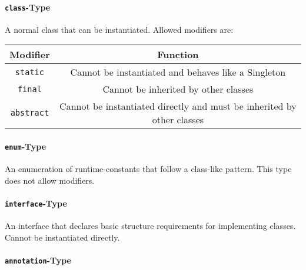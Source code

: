 \documentclass{docs}
\begin{document}
    \paragraph{\texttt{class}-Type}
    A normal class that can be instantiated.
    Allowed modifiers are:
    \begin{center}
    \begin{tabular}{c|c}
        Modifier & Function \\
        \hline
        \texttt{static} & Cannot be instantiated and behaves like a Singleton \\
        \texttt{final} & Cannot be inherited by other classes \\
        \texttt{abstract} & Cannot be instantiated directly and must be inherited by other classes
    \end{tabular}
    \end{center}
    \paragraph{\texttt{enum}-Type}
    An enumeration of runtime-constants that follow a class-like pattern.
    This type does not allow modifiers.
    \paragraph{\texttt{interface}-Type}
    An interface that declares basic structure requirements for implementing classes.
    Cannot be instantiated directly.
    \paragraph{\texttt{annotation}-Type}
\end{document}
